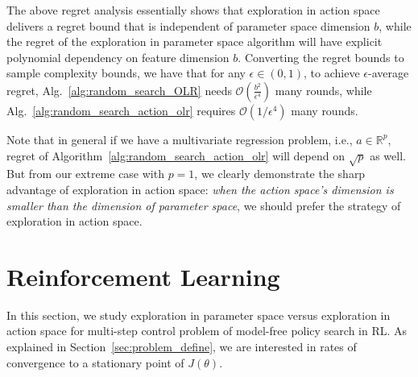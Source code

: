 The above regret analysis essentially shows that exploration in action space delivers a regret bound that is independent of parameter space dimension $b$, while the regret of the exploration in parameter space algorithm will have explicit polynomial dependency on feature dimension $b$.  Converting the regret bounds to sample complexity bounds, we have that for any $\epsilon\in (0,1)$, to achieve $\epsilon$-average regret, Alg.~\ref{alg:random_search_OLR} needs $\mathcal{O}(\frac{b^2}{\epsilon^4})$ many rounds, while Alg.~\ref{alg:random_search_action_olr} requires $\mathcal{O}(1/\epsilon^4)$ many rounds.  

Note that in general if we have a multivariate regression problem, i.e., $a\in\mathbb{R}^{p}$, regret of Algorithm~\ref{alg:random_search_action_olr} will depend on $\sqrt{p}$ as well. But from our extreme case with $p=1$, we clearly demonstrate the sharp advantage of exploration in action space: \emph{when the action space's dimension is smaller than the dimension of parameter space}, we should prefer the strategy of exploration in action space.




\section{Reinforcement Learning}
\label{sec:RL}

In this section, we study exploration in parameter space versus exploration in action space for multi-step control problem of model-free policy search in RL. As explained in Section~\ref{sec:problem_define}, we are interested in rates of convergence to a stationary point of $J(\theta)$.

